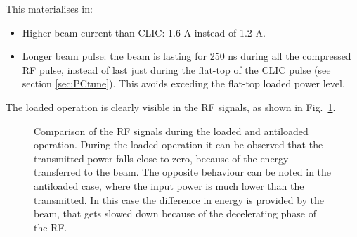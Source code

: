 This materialises in:
\begin{itemize}
\item Higher beam current than CLIC: 1.6 A instead of 1.2 A.
\item Longer beam pulse: the beam is lasting for 250 ns during all the compressed RF pulse, instead of last just during the flat-top of the CLIC pulse (see section \ref{sec:PCtune}). This avoids exceding the flat-top loaded power level.
\end{itemize}
The loaded operation is clearly visible  in the RF signals, as shown in Fig.~\ref{RF_load}.

\begin{figure}[h]
\centering
\caption{Comparison of the RF signals during the loaded and antiloaded operation. During the loaded operation it can be observed that the transmitted power falls close to zero, because of the energy transferred to the beam. The opposite behaviour can be noted in the antiloaded case, where the input power is much lower than the transmitted. In this case the difference in energy is provided by the beam, that gets slowed down because of the decelerating phase of the RF. }
 \label{RF_load}
 \end{figure}


